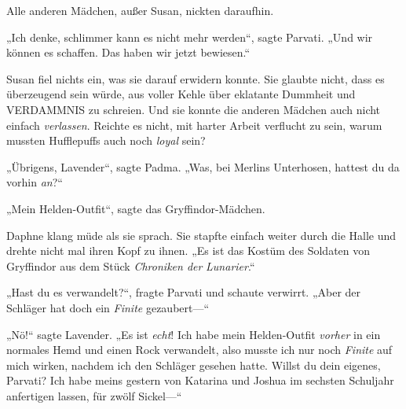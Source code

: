 Alle anderen Mädchen, außer Susan, nickten daraufhin.

„Ich denke, schlimmer kann es nicht mehr werden“, sagte Parvati. „Und wir können es schaffen. Das haben wir jetzt bewiesen.“

Susan fiel nichts ein, was sie darauf erwidern konnte. Sie glaubte nicht, dass es überzeugend sein würde, aus voller Kehle über eklatante Dummheit und VERDAMMNIS zu schreien. Und sie konnte die anderen Mädchen auch nicht einfach \emph{verlassen}. Reichte es nicht, mit harter Arbeit verflucht zu sein, warum mussten Hufflepuffs auch noch \emph{loyal} sein?

„Übrigens, Lavender“, sagte Padma. „Was, bei Merlins Unterhosen, hattest du da vorhin \emph{an}?“

„Mein Helden-Outfit“, sagte das Gryffindor-Mädchen.

Daphne klang müde als sie sprach. Sie stapfte einfach weiter durch die Halle und drehte nicht mal ihren Kopf zu ihnen. „Es ist das Kostüm des Soldaten von Gryffindor aus dem Stück \emph{Chroniken der} \emph{Lunarier}.“%

„Hast du es verwandelt?“, fragte Parvati und schaute verwirrt. „Aber der Schläger hat doch ein \emph{Finite} gezaubert—“

„Nö!“ sagte Lavender. „Es ist \emph{echt}! Ich habe mein Helden-Outfit \emph{vorher} in ein normales Hemd und einen Rock verwandelt, also musste ich nur noch \emph{Finite} auf mich wirken, nachdem ich den Schläger gesehen hatte. Willst du dein eigenes, Parvati? Ich habe meins gestern von Katarina und Joshua im sechsten Schuljahr anfertigen lassen, für zwölf Sickel—“

